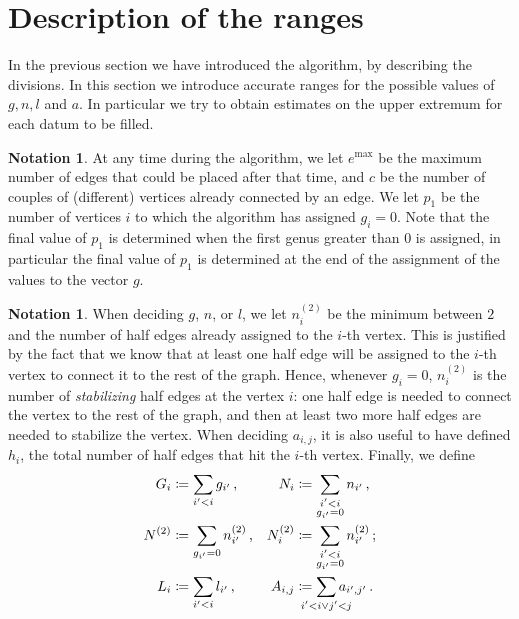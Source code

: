 \documentclass{amsart}
\theoremstyle{plain}
\theoremstyle{definition}
\newtheorem{notation}[theorem]{Notation}
\DeclareMathOperator{\MAX}{max}
\begin{document}
\section{Description of the ranges}\label{sec:ranges}

In the previous section we have introduced the algorithm, by
describing the divisions. In this section we introduce accurate ranges
for the possible values of $g,n,l$ and $a$. In particular we try to
obtain estimates on the upper extremum for each datum to be filled.

\begin{notation}
  At any time during the algorithm, we let $e^{\MAX}$ be the maximum
  number of edges that could be placed after that time, and $c$ be the
  number of couples of (different) vertices already connected by an
  edge. We let $p_1$ be the number of vertices $i$ to which the
  algorithm has assigned $g_i = 0$. Note that the final value of $p_1$
  is determined when the first genus greater than $0$ is assigned, in
  particular the final value of $p_1$ is determined at the end of the
  assignment of the values to the vector $g$.
\end{notation}

\begin{notation}
  When deciding $g$, $n$, or $l$, we let $n^{(2)}_i$ be the minimum
  between $2$ and the number of half edges already assigned to the
  $i$-th vertex. This is justified by the fact that we know that at
  least one half edge will be assigned to the $i$-th vertex to connect
  it to the rest of the graph. Hence, whenever $g_i = 0$, $n^{(2)}_i$
  is the number of \emph{stabilizing\/} half edges at the vertex $i$:
  one half edge is needed to connect the vertex to the rest of the graph,
  and then at least two more half edges are needed to stabilize the
  vertex. When deciding $a_{i,j}$, it is also useful to have defined
  $h_i$, the total number of half edges that hit the $i$-th
  vertex. Finally, we define
  \begin{align*}
    G_i &\coloneqq \sum_{i^\prime < i} g_{i^\prime}\,\text{,} &
    N_i &\coloneqq \sum_{\substack{i^\prime < i\\g_{i^\prime} = 0}} n_{i^\prime}\,\text{,}\\
    N^{(2)} &\coloneqq \sum_{g_{i^\prime} = 0} n^{(2)}_{i^\prime}\,\text{,} &
    N^{(2)}_i &\coloneqq \sum_{\substack{i^\prime < i\\g_{i^\prime} = 0}} n^{(2)}_{i^\prime}\,\text{;}\\
    L_i &\coloneqq \sum_{i^\prime < i} l_{i^\prime}\,\text{,} &
    A_{i,j} &\coloneqq \sum_{\mathclap{i^\prime < i \vee j^\prime < j}} a_{i^\prime, j^\prime}\,\text{.}
  \end{align*}
\end{notation}
\end{document}
